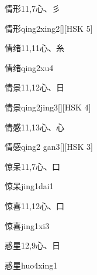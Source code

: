 \begin{entry}{情形}{11,7}{⼼、⼺}
  \begin{phonetics}{情形}{qing2xing2}[][HSK 5]
  \end{phonetics}
\end{entry}

\begin{entry}{情绪}{11,11}{⼼、⽷}
  \begin{phonetics}{情绪}{qing2xu4}
  \end{phonetics}
\end{entry}

\begin{entry}{情景}{11,12}{⼼、⽇}
  \begin{phonetics}{情景}{qing2jing3}[][HSK 4]
  \end{phonetics}
\end{entry}

\begin{entry}{情感}{11,13}{⼼、⼼}
  \begin{phonetics}{情感}{qing2 gan3}[][HSK 3]
  \end{phonetics}
\end{entry}

\begin{entry}{惊呆}{11,7}{⼼、⼝}
  \begin{phonetics}{惊呆}{jing1dai1}
  \end{phonetics}
\end{entry}

\begin{entry}{惊喜}{11,12}{⼼、⼝}
  \begin{phonetics}{惊喜}{jing1xi3}
  \end{phonetics}
\end{entry}

\begin{entry}{惑星}{12,9}{⼼、⽇}
  \begin{phonetics}{惑星}{huo4xing1}
  \end{phonetics}
\end{entry}

